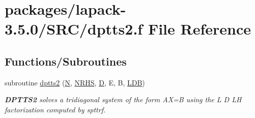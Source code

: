 \hypertarget{dptts2_8f}{}\section{packages/lapack-\/3.5.0/\+S\+R\+C/dptts2.f File Reference}
\label{dptts2_8f}
\subsection*{Functions/\+Subroutines}
\begin{DoxyCompactItemize}
\item 
subroutine \hyperlink{group__doublePTcomputational_gaf85ae9b8724a8f9b25e67da33ba5ab99}{dptts2} (\hyperlink{polmisc_8c_a0240ac851181b84ac374872dc5434ee4}{N}, \hyperlink{example__user_8c_aa0138da002ce2a90360df2f521eb3198}{N\+R\+H\+S}, \hyperlink{odrpack_8h_a7dae6ea403d00f3687f24a874e67d139}{D}, E, B, \hyperlink{example__user_8c_a50e90a7104df172b5a89a06c47fcca04}{L\+D\+B})
\begin{DoxyCompactList}\small\item\em {\bfseries D\+P\+T\+T\+S2} solves a tridiagonal system of the form A\+X=B using the L D L\+H factorization computed by spttrf. \end{DoxyCompactList}\end{DoxyCompactItemize}
